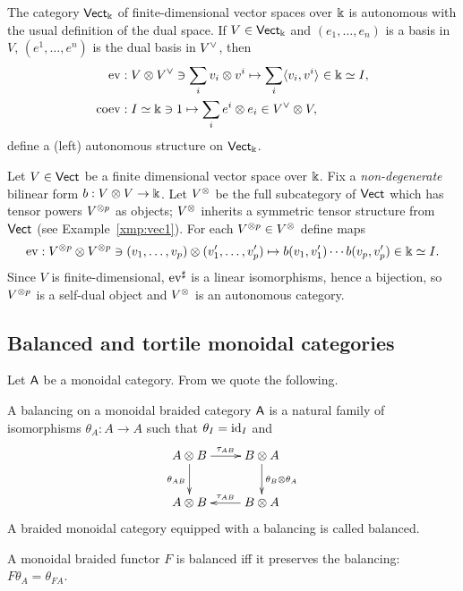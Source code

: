 \begin{example}\label{xmp:vect-duality}
  The category $\catVect[\fk]$ of finite-dimensional vector spaces over
  $\fk$ is autonomous with the usual definition of the dual space. If
  $V \in \catVect[\fk]$ and $(e_1, \ldots, e_n)$ is a basis in $V$, $(e^1, \ldots,
  e^n)$ is the dual basis in $\rdl{V}$, then
  \begin{align*}
    \ev &: V \otimes \rdl{V} \ni \sum_i v_i \otimes v^i \mapsto \sum_i \pairing{v_i}{v^i}
    \in \fk \simeq I,
    \\
    \coev &: I \simeq \fk \ni 1 \mapsto \sum_i e^i \otimes e_i \in \rdl{V} \otimes V,
  \end{align*}
  define a (left) autonomous structure on $\catVect[\fk]$. 
\end{example}

\begin{example}\label{xmp:vect-duality-nondeg}
  Let $V \in \catVect$ be a finite dimensional vector space over
  $\fk$. Fix a \emph{non-degenerate} bilinear form $b: V\otimes V \to
  \fk$. Let $\freemc{V}$ be the full subcategory of $\catVect$ which
  has tensor powers $V\tp{p}$ as objects; $\freemc{V}$ inherits a
  symmetric tensor structure from $\catVect$ (see
  Example~\ref{xmp:vec1}). For each $V\tp{p} \in \freemc{V}$ define maps
  \begin{equation*}
    \ev: V\tp{p} \otimes V\tp{p} \ni (v_1, \ldots, v_p) \otimes (v'_1, \ldots, v'_p) \mapsto
    b(v_1, v'_1) \cdots b(v_p, v'_p) \in \fk \simeq I.
  \end{equation*}
  Since $V$ is finite-dimensional, $\ev^\sharp$ is a linear isomorphisms,
  hence a bijection, so $V\tp{p}$ is a self-dual object and
  $\freemc{V}$ is an autonomous category.
\end{example}


\subsection{Balanced and tortile monoidal categories}
\label{sec:tortile}

Let $\A$ be a monoidal category. From \cite{joyal-street;btc} we quote
the following.
\begin{definition}
  A balancing on a monoidal braided category $\A$ is a natural family of
  isomorphisms $\theta_A:A\to A$ such that $\theta_I = \id_I$ and 
  \begin{equation*}
    \xymatrix{%
      A\otimes B
      &
      B\otimes A
      \\
      A\otimes B
      &
      B\otimes A
      \ar "1,1";"1,2" ^{\tau_{AB}}
      \ar "1,1";"2,1" _{\theta_{AB}}
      \ar "2,2";"2,1" _{\tau_{AB}}
      \ar "1,2";"2,2" ^{\theta_B\otimes\theta_A}
      }
  \end{equation*}
  A braided monoidal category equipped with a balancing is called
  balanced.

  A monoidal braided functor $F$ is balanced iff it preserves the
  balancing: $F\theta_A = \theta_{FA}$.
\end{definition}

